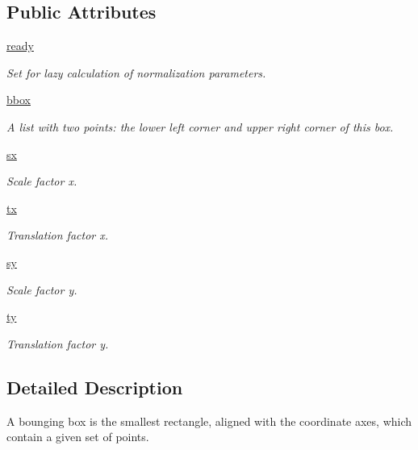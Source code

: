 \subsection*{Public Attributes}
\begin{DoxyCompactItemize}
\item 
\hyperlink{classgeometry_1_1Box_aaa2928bad8272b83deb2cbe543b68c66}{ready}
\begin{DoxyCompactList}\small\item\em Set for lazy calculation of normalization parameters. \end{DoxyCompactList}\item 
\hyperlink{classgeometry_1_1Box_a6bf768dc4c7628cc2fe863eb3a002475}{bbox}
\begin{DoxyCompactList}\small\item\em A list with two points\+: the lower left corner and upper right corner of this box. \end{DoxyCompactList}\item 
\hyperlink{classgeometry_1_1Box_a43781b0f4c451cbb542c20b5fbd4b5dd}{sx}
\begin{DoxyCompactList}\small\item\em Scale factor x. \end{DoxyCompactList}\item 
\hyperlink{classgeometry_1_1Box_a0e744b5244823afefa01b40c2613037f}{tx}
\begin{DoxyCompactList}\small\item\em Translation factor x. \end{DoxyCompactList}\item 
\hyperlink{classgeometry_1_1Box_a223765001a3661705685ed85647a54ff}{sy}
\begin{DoxyCompactList}\small\item\em Scale factor y. \end{DoxyCompactList}\item 
\hyperlink{classgeometry_1_1Box_aca0410b99a6d8b59060f6fcbf12db160}{ty}
\begin{DoxyCompactList}\small\item\em Translation factor y. \end{DoxyCompactList}\end{DoxyCompactItemize}


\subsection{Detailed Description}
A bounging box is the smallest rectangle, aligned with the coordinate axes, which contain a given set of points. 

